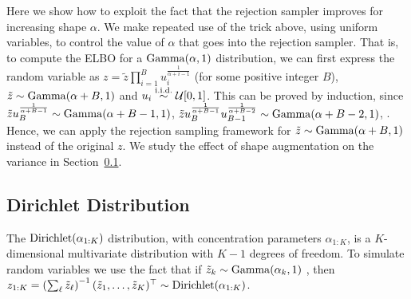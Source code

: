 
Here we show how to exploit the fact that the rejection sampler improves for increasing shape $\alpha$. We make repeated use of the trick above, using uniform variables, to control the value of $\alpha$ that goes into the rejection sampler. That is, to compute the \gls{ELBO} for a $\operatorname*{Gamma}(\alpha,1)$ distribution, we can first express the random variable as $z = \tilde z \prod_{i=1}^B u_i^{\frac{1}{\alpha+i-1}}$ (for some positive integer $B$), $\tilde z \sim \operatorname*{Gamma}(\alpha+B,1)$ and $u_i \iidsim \uni[0,1]$. This can be proved by induction, since $\tilde z u_B^{\frac{1}{\alpha+B-1}} \sim \operatorname*{Gamma}(\alpha+B-1,1)$, $\tilde z u_B^{\frac{1}{\alpha+B-1}} u_{B-1}^{\frac{1}{\alpha+B-2}} \sim \operatorname*{Gamma}(\alpha+B-2,1)$, \etc. Hence, we can apply the rejection sampling framework for $\tilde z \sim \operatorname*{Gamma}(\alpha+B,1)$ instead of the original $z$. We study the effect of shape augmentation on the variance in Section~\ref{subsec:dirichlet_example}.


\subsection{Dirichlet Distribution}
\label{subsec:dirichlet_example}

The $\operatorname*{Dirichlet}(\alpha_{1:K})$ distribution, with concentration parameters $\alpha_{1:K}$, is a $K$-dimensional multivariate distribution with ${K-1}$ degrees of freedom. To simulate random variables we use the fact that if ${\tilde z_k \sim \operatorname*{Gamma}(\alpha_k,1)}$ \iid, then ${z_{1:K} = \left(\sum_\ell \tilde z_\ell\right)^{-1}(\tilde z_1,\ldots,\tilde z_K)^\top \sim \operatorname*{Dirichlet}(\alpha_{1:K})}$. 

